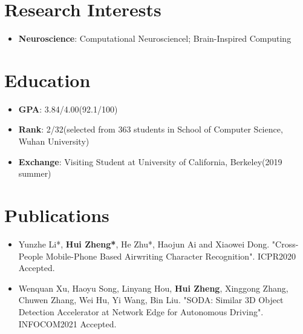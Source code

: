\documentclass{resume}
\begin{document}
    

\section{{\bfseries Research Interests}}
\begin{itemize}[parsep=0.2ex]
\item \textbf{Neuroscience}: Computational Neurosciencel; Brain-Inspired Computing
\end{itemize}

\section{{\bfseries Education}}
\begin{itemize}[parsep=0.1ex]
    \item \textbf{GPA}: 3.84/4.00(92.1/100)
    \item \textbf{Rank}: 2/32(selected from 363 students in School of Computer Science, Wuhan University)
    \item \textbf{Exchange}: Visiting Student at University of California, Berkeley(2019 summer)
\end{itemize}

\section{{\bfseries Publications}}
\begin{itemize}[parsep=0.2ex]
    \item Yunzhe Li*, \textbf{Hui Zheng*}, He Zhu*, Haojun Ai and Xiaowei Dong. "Cross-People Mobile-Phone Based Airwriting Character Recognition". ICPR2020 Accepted.
    \item Wenquan Xu, Haoyu Song, Linyang Hou, \textbf{Hui Zheng}, Xinggong Zhang, Chuwen Zhang, Wei Hu, Yi Wang, Bin Liu. "SODA: Similar 3D Object Detection Accelerator at Network Edge for Autonomous Driving". INFOCOM2021 Accepted.
\end{itemize}

\end{document}
